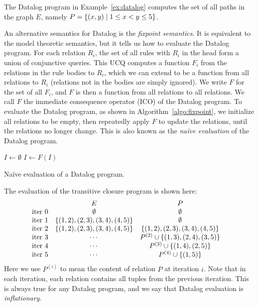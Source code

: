 \begin{ex}
\label{ex:tc}
The Datalog program in Example~\ref{ex:datalog}
 computes the set of all paths in the graph $E$, 
 namely $P = \{{(x, y)}\mid{1 \leq x < y \leq 5}\}$. 
\end{ex}

An alternative semantics for Datalog is the {\em fixpoint semantics}.
It is equivalent to the model theoretic semantics,
 but it tells us how to evaluate the Datalog program.
For each relation $R_i$, the set of all rules with $R_i$ in the head 
 form a union of conjunctive queries.
This UCQ computes a function $F_i$ from the relations in the rule bodies to $R_i$,
 which we can extend to be a function from all relations to $R_i$ 
 (relations not in the bodies are simply ignored). 
We write $F$ for the set of all $F_i$, 
 and $F$ is then a function from all relations to all relations.
We call $F$ the immediate consequence operator (ICO) of the Datalog program.
To evaluate the Datalog program, as shown in Algorithm~\ref{algo:fixpoint},
 we initialize all relations to be empty,
 then repeatedly apply $F$ to update the relations, 
 until the relations no longer change.
This is also known as the {\em na\"ive evaluation} of the Datalog program.
\begin{algorithm}
$I \gets \emptyset$\;
{
    $I \gets F(I)$\;
}
\caption{Na\"ive evaluation of a Datalog program.}
\label{algo:fixpoint}
\end{algorithm}

\begin{ex}
\label{ex:tc-fixpoint}
The evaluation of the transitive closure program is shown here:
%
\begin{align*}
    &
    \begin{array}{l c c } 
                       & E & P \\ 
        \text{iter } 0 & \emptyset & \emptyset \\ 
        \text{iter } 1 & \{(1, 2), (2, 3), (3, 4), (4, 5)\} & \emptyset \\ 
        \text{iter } 2 & \{(1, 2), (2, 3), (3, 4), (4, 5)\} & \{(1, 2), (2, 3), (3, 4), (4, 5)\} \\ 
        \text{iter } 3 & \cdots & P^{(2)} \cup \{ (1, 3), (2, 4), (3, 5)\} \\
        \text{iter } 4 & \cdots & P^{(3)} \cup \{ (1, 4), (2, 5) \} \\
        \text{iter } 5 & \cdots & P^{(4)} \cup \{ (1, 5) \} \\
    \end{array}
\end{align*}
%
Here we use $P^{(i)}$ to mean the content of relation $P$ at iteration $i$.
Note that in each iteration, each relation contains all tuples from the previous iteration.
This is always true for any Datalog program, 
 and we say that Datalog evaluation is {\em inflationary}.
\end{ex}


